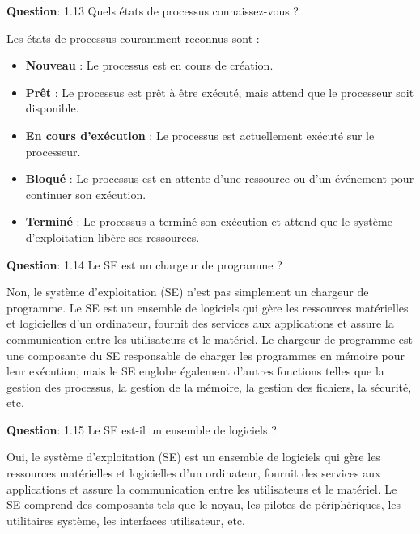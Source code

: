 \vspace{0.5cm}

\noindent \textbf{Question}: 1.13 Quels états de processus connaissez-vous ?

\noindent Les états de processus couramment reconnus sont :
\begin{itemize}
	\item \textbf{Nouveau} : Le processus est en cours de création.
	\item \textbf{Prêt} : Le processus est prêt à être exécuté, mais attend que le processeur soit disponible.
	\item \textbf{En cours d'exécution} : Le processus est actuellement exécuté sur le processeur.
	\item \textbf{Bloqué} : Le processus est en attente d'une ressource ou d'un événement pour continuer son exécution.
	\item \textbf{Terminé} : Le processus a terminé son exécution et attend que le système d'exploitation libère ses ressources.
\end{itemize}

\vspace{0.5cm}

\noindent \textbf{Question}: 1.14 Le SE est un chargeur de programme ?

\noindent Non, le système d'exploitation (SE) n'est pas simplement un chargeur de programme. Le SE est un ensemble de logiciels qui gère les ressources matérielles et logicielles d'un ordinateur, fournit des services aux applications et assure la communication entre les utilisateurs et le matériel. Le chargeur de programme est une composante du SE responsable de charger les programmes en mémoire pour leur exécution, mais le SE englobe également d'autres fonctions telles que la gestion des processus, la gestion de la mémoire, la gestion des fichiers, la sécurité, etc.

\vspace{0.5cm}

\noindent \textbf{Question}: 1.15 Le SE est-il un ensemble de logiciels ?

\noindent Oui, le système d'exploitation (SE) est un ensemble de logiciels qui gère les ressources matérielles et logicielles d'un ordinateur, fournit des services aux applications et assure la communication entre les utilisateurs et le matériel. Le SE comprend des composants tels que le noyau, les pilotes de périphériques, les utilitaires système, les interfaces utilisateur, etc.

\vspace{0.5cm}

